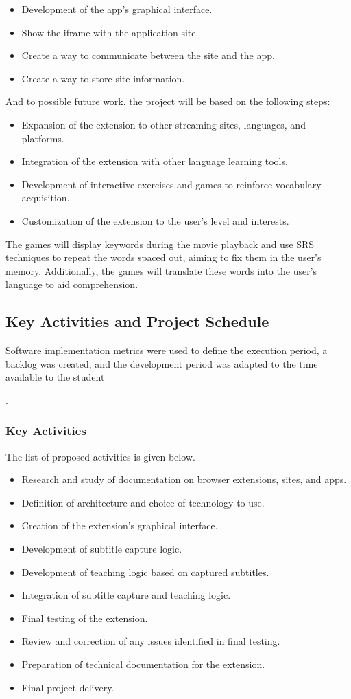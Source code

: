 \documentclass[12pt]{article}
\begin{document}
\begin{itemize}
\item Development of the app's graphical interface.
\item Show the iframe with the application site.
\item Create a way to communicate between the site and the app.
\item Create a way to store site information.
\end{itemize}
And to possible future work, the project will be based on the following steps:
\begin{itemize}
\item Expansion of the extension to other streaming sites, languages, and platforms.
\item Integration of the extension with other language learning tools.
\item Development of interactive exercises and games to reinforce vocabulary acquisition.
\item Customization of the extension to the user's level and interests. 
\end{itemize}
The games will display keywords during the movie playback and use SRS techniques to repeat the words spaced out, aiming to fix them in the user's memory. Additionally, the games will translate these words into the user's language to aid comprehension. 

\subsection{Key Activities and Project Schedule}

Software implementation metrics were used to define the execution period, a backlog was created, and the development period was adapted to the time available to the student \author{J. Emanuel Cascone R. S.}.

\subsubsection{Key Activities}

The list of proposed activities is given below.

\begin{itemize}
\item Research and study of documentation on browser extensions, sites, and apps.
\item Definition of architecture and choice of technology to use.
\item Creation of the extension's graphical interface.
\item Development of subtitle capture logic.
\item Development of teaching logic based on captured subtitles.
\item Integration of subtitle capture and teaching logic.
\item Final testing of the extension.
\item Review and correction of any issues identified in final testing.
\item Preparation of technical documentation for the extension.
\item Final project delivery.
\end{itemize}
\end{document}
